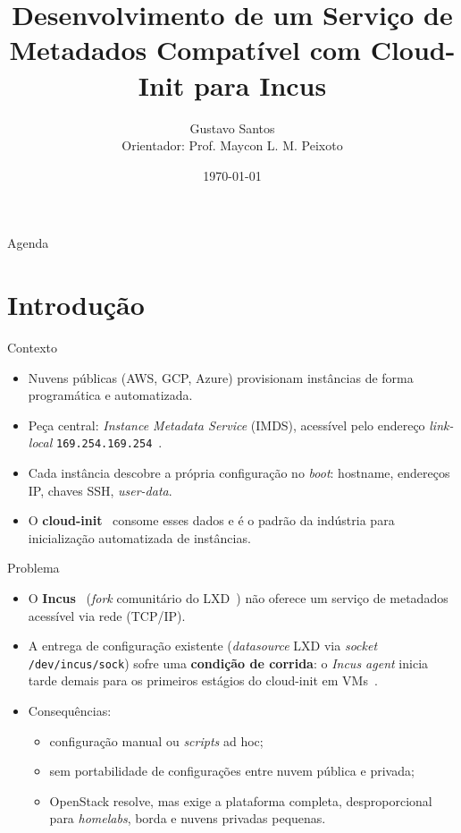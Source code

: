 \documentclass[aspectratio=169,xcolor=table]{beamer}
\author{Gustavo Santos \\ \vspace{0.2cm} {\small Orientador: Prof. Maycon L. M. Peixoto}}
\title{Desenvolvimento de um Serviço de Metadados Compatível com Cloud-Init para Incus}
\institute{Departamento de Ciência da Computação -- Universidade Federal da Bahia}
\date{\today}
\begin{document}
\begin{frame}
    \titlepage
\end{frame}

\begin{frame}{Agenda}
    \tableofcontents
\end{frame}

\section{Introdução}
\sectionframe

\begin{frame}{Contexto}
    \begin{itemize}
        \item Nuvens públicas (AWS, GCP, Azure) provisionam instâncias de forma
              programática e automatizada.
        \item Peça central: \textit{Instance Metadata Service} (IMDS), acessível pelo
              endereço \textit{link-local} \texttt{169.254.169.254}~\cite{aws_imds}.
        \item Cada instância descobre a própria configuração no \textit{boot}:
              hostname, endereços IP, chaves SSH, \textit{user-data}.
        \item O \textbf{cloud-init}~\cite{cloudinit2024} consome esses dados e é o
              padrão da indústria para inicialização automatizada de instâncias.
    \end{itemize}
\end{frame}

\begin{frame}{Problema}
    \begin{itemize}
        \item O \textbf{Incus}~\cite{incus2024} (\textit{fork} comunitário do LXD~\cite{incus_announcement}) não
              oferece um serviço de metadados acessível via rede (TCP/IP).
        \item A entrega de configuração existente (\textit{datasource} LXD via
              \textit{socket} \texttt{/dev/incus/sock}) sofre uma \textbf{condição de
              corrida}: o \textit{Incus agent} inicia tarde demais para os primeiros
              estágios do cloud-init em VMs~\cite{incus_cloudinit_forum}.
        \item Consequências:
        \begin{itemize}
            \item configuração manual ou \textit{scripts} ad hoc;
            \item sem portabilidade de configurações entre nuvem pública e privada;
            \item OpenStack resolve, mas exige a plataforma completa, desproporcional
                  para \textit{homelabs}, borda e nuvens privadas pequenas.
        \end{itemize}
    \end{itemize}
\end{frame}
\end{document}
